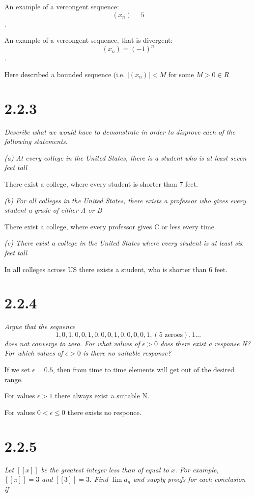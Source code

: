 \documentclass[11pt,oneside,titlepage]{article}
\begin{document}
An example of a vercongent sequence:
$$(x_n) = 5$$.

An example of a vercongent sequence, that is divergent:
$$(x_n) = (-1)^n$$.

Here described a bounded sequence (i.e. $|(x_n)| < M$  for some $M > 0\in R$

\section*{2.2.3}
\textit{Describe what we would have to demonstrate in order to disprove each
  of the following statements.}

\textit{(a) At every college in the United States, there is a student who is at least
  seven feet tall}

There exist a college, where every student is shorter than 7 feet.

\textit{(b) For all colleges in the United States, there exists a professor who
  gives every student a grade of either A or B}

There exist a college, where every professor gives C or less every time.

\textit{(c) There exist a college in the United States where every student is at least
  six feet tall}

In all colleges across US there exists a student, who is shorter than 6 feet.

\section*{2.2.4}
\textit{Argue that the sequence }
$$1, 0, 1, 0, 0, 1, 0, 0, 0, 1, 0, 0, 0, 0, 1, (\text{5 zeroes}), 1...$$
\textit{
  does not converge to zero. For what values of $\epsilon > 0$ does there exist a response
  N? For which values of $\epsilon > 0$ is there no suitable response?}

If we set $\epsilon = 0.5$, then from time to time elements will get out of
the desired range.

For values $\epsilon > 1$ there always exist a suitable N.

For values $ 0 < \epsilon \leq 0$ there exists no responce.

\section*{2.2.5}
\textit{Let $[[x]]$ be the greatest integer less than of equal to $x$. For example,
  $[[\pi]] = 3$ and $[[3]] = 3$. Find $\lim a_n$ and supply proofs for each conclusion
  if}
\end{document}
